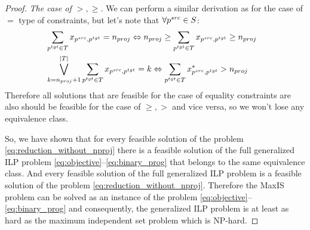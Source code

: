 \begin{proof}
  \textit{The case of \( >, \geq \).} We can perform a similar derivation as for the case of \( = \) type of constraints, but
  let's note that \( \forall p^{src} \in S \):
  \begin{align*}
    & \sum\limits_{p^{tgt} \in T} x_{p^{src}, p^{tgt}} = n_{proj} \Leftrightarrow
    n_{proj} \geq \sum\limits_{p^{tgt} \in T} x_{p^{src}, p^{tgt}} \geq n_{proj}                                  \\
    & \bigvee\limits_{k=n_{proj} + 1}^{|T|} \sum\limits_{p^{tgt} \in T} x_{p^{src}, p^{tgt}} = k \Leftrightarrow
    \sum\limits_{p^{tgt} \in T} x^*_{p^{src}, p^{tgt}} > n_{proj} \qquad
  \end{align*}
  Therefore all solutions that are feasible for the case of equality constraints are also should be
  feasible for the case of \( \geq, > \) and vice versa, so we won't lose any equivalence class.

  So, we have shown that for every feasible solution of the problem \eqref{eq:reduction_without_nproj} there is
  a feasible solution of the full generalized ILP problem \eqref{eq:objective}--\eqref{eq:binary_prog} that belongs to the
  same equivalence class. And every feasible solution of the full generalized ILP problem is a feasible solution of the problem \eqref{eq:reduction_without_nproj}.
  Therefore the MaxIS problem can be solved as an instance of the problem \eqref{eq:objective}--\eqref{eq:binary_prog}
  and consequently, the generalized ILP problem is at least as hard as the maximum independent set problem which is NP-hard.
\end{proof}
